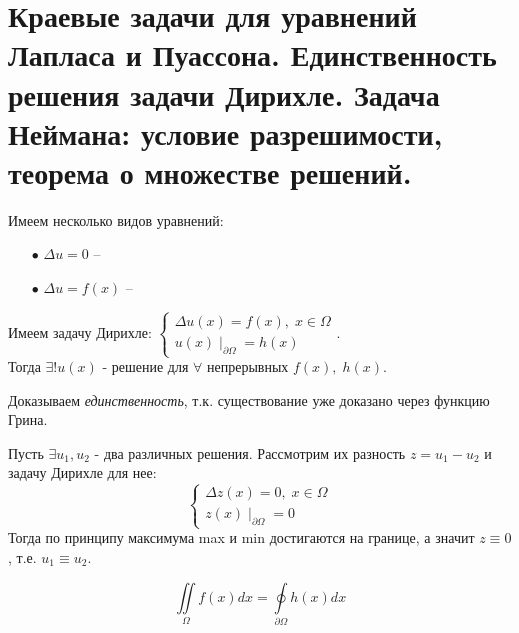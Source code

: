 \chapter{Краевые задачи для уравнений Лапласа и Пуассона. Единственность решения задачи Дирихле. Задача Неймана: условие разрешимости, теорема о множестве решений.}
\label{cha:19}

\begin{definition}
	Имеем несколько видов уравнений:
	\begin{itemize}
		\item[$\bullet$] $ \Delta u = 0 $ -- 
		\item[$\bullet$] $ \Delta u = f(x) $ -- 
	\end{itemize}
\end{definition}

\begin{theorem}
	$\;$\\
	Имеем задачу Дирихле: 
	$\begin{cases}
		\Delta u(x) = f(x), \; x \in \Omega \\
		u(x) \mid_{\partial \Omega} = h(x)
	\end{cases}$. \\
	Тогда $ \exists ! u(x) $ - решение для $ \forall \text{ непрерывных } f(x), \; h(x)$.
\end{theorem}
\begin{Proof}
	Доказываем \textit{единственность}, т.к. существование уже доказано через функцию Грина.

	Пусть $\exists u_1, u_2 $ - два различных решения. Рассмотрим их разность $ z = u_1 - u_2 $ и задачу Дирихле для нее:
	$$\begin{cases}
		\Delta z(x) = 0, \; x \in \Omega \\
		z(x) \mid_{\partial \Omega} = 0
	\end{cases}$$
	Тогда по принципу максимума max и min достигаются на границе, а значит $ z \equiv 0$, т.е. $u_1 \equiv u_2$.
\end{Proof}

\begin{definition}
	$$\iint\limits_{\Omega} f(x)dx = \oint\limits_{\partial\Omega}h(x)dx$$
\end{definition}

